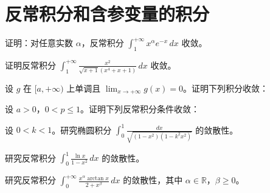 \renewcommand{\thesection}{\arabic{section}}\renewcommand{\theHsection}{chapter.\arabic{section}}\setcounter{section}{12}\section{反常积分和含参变量的积分}
\noindent\begin{minipage}{\textwidth}
证明：对任意实数 $\alpha$，反常积分 $\displaystyle\int_1^{+\infty}x^\alpha e^{-x}\,dx$ 收敛。
\end{minipage}\par\vfill
\noindent\begin{minipage}{\textwidth}
证明反常积分 $\displaystyle\int_1^{+\infty}\frac{x^2}{\sqrt{x+1}(x^4+x+1)}\,dx$ 收敛。
\end{minipage}\par\vfill
\noindent\begin{minipage}{\textwidth}
设 $g$ 在 $[a,+\infty)$ 上单调且 $\lim_{x\to+\infty}g(x)=0$。证明下列积分收敛：
\end{minipage}\par\vfill
\noindent\begin{minipage}{\textwidth}
设 $a>0$，$0<p\le1$。证明下列反常积分条件收敛：
\end{minipage}\par\vfill
\newpage
\noindent\begin{minipage}{\textwidth}
设 $0<k<1$。研究椭圆积分 $\displaystyle\int_0^1\frac{dx}{\sqrt{(1-x^2)(1-k^2x^2)}}$ 的敛散性。
\end{minipage}\par\vfill
\noindent\begin{minipage}{\textwidth}
研究反常积分 $\displaystyle\int_0^1\frac{\ln x}{1-x^2}\,dx$ 的敛散性。
\end{minipage}\par\vfill
\noindent\begin{minipage}{\textwidth}
研究反常积分 $\displaystyle\int_0^{+\infty}\frac{x^\alpha\arctan x}{2+x^\beta}\,dx$ 的敛散性，其中 $\alpha\in\mathbb R$，$\beta\ge0$。
\end{minipage}\par\vfill
